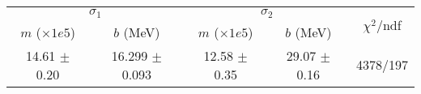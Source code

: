 \begin{tabular}{cc|cc||c}
\multicolumn{2}{c|}{$\sigma_1$} & \multicolumn{2}{|c}{$\sigma_2$}  & \multirow{2}{*}{$\chi^2/$ndf}\\
$m$ ($\times1e5$) & $b$ (MeV) & $m$ ($\times1e5$) & $b$ (MeV)  & \\
\hline
14.61 $\pm$ 0.20 & 16.299 $\pm$ 0.093 & 12.58 $\pm$ 0.35 & 29.07 $\pm$ 0.16 & 4378/197\\
\end{tabular}
